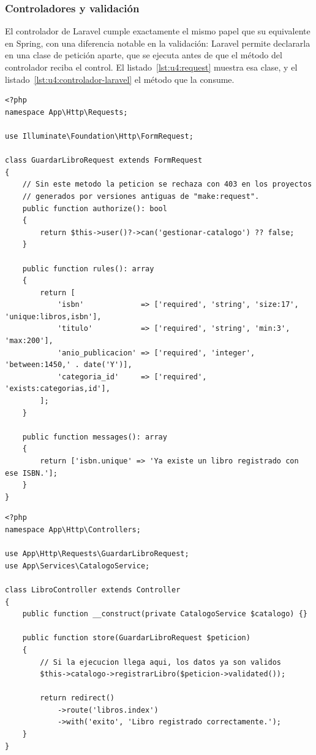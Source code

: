 \documentclass[11pt,a4paper,openany]{book}
\begin{document}
\subsubsection{Controladores y validación}

El controlador de Laravel cumple exactamente el mismo papel que su equivalente en Spring, con una diferencia notable en la validación: Laravel permite declararla en una clase de petición aparte, que se ejecuta antes de que el método del controlador reciba el control. El listado~\ref{lst:u4:request} muestra esa clase, y el listado~\ref{lst:u4:controlador-laravel} el método que la consume.

\begin{lstlisting}[style=php,caption={Clase de peticion con reglas de validacion declarativas.},label={lst:u4:request}]
<?php
namespace App\Http\Requests;

use Illuminate\Foundation\Http\FormRequest;

class GuardarLibroRequest extends FormRequest
{
	// Sin este metodo la peticion se rechaza con 403 en los proyectos
	// generados por versiones antiguas de "make:request".
	public function authorize(): bool
	{
		return $this->user()?->can('gestionar-catalogo') ?? false;
	}

	public function rules(): array
	{
		return [
			'isbn'             => ['required', 'string', 'size:17', 'unique:libros,isbn'],
			'titulo'           => ['required', 'string', 'min:3', 'max:200'],
			'anio_publicacion' => ['required', 'integer', 'between:1450,' . date('Y')],
			'categoria_id'     => ['required', 'exists:categorias,id'],
		];
	}

	public function messages(): array
	{
		return ['isbn.unique' => 'Ya existe un libro registrado con ese ISBN.'];
	}
}
\end{lstlisting}

\begin{lstlisting}[style=php,caption={Metodo de controlador que recibe la peticion ya validada.},label={lst:u4:controlador-laravel}]
<?php
namespace App\Http\Controllers;

use App\Http\Requests\GuardarLibroRequest;
use App\Services\CatalogoService;

class LibroController extends Controller
{
	public function __construct(private CatalogoService $catalogo) {}

	public function store(GuardarLibroRequest $peticion)
	{
		// Si la ejecucion llega aqui, los datos ya son validos
		$this->catalogo->registrarLibro($peticion->validated());

		return redirect()
			->route('libros.index')
			->with('exito', 'Libro registrado correctamente.');
	}
}
\end{lstlisting}
\end{document}
